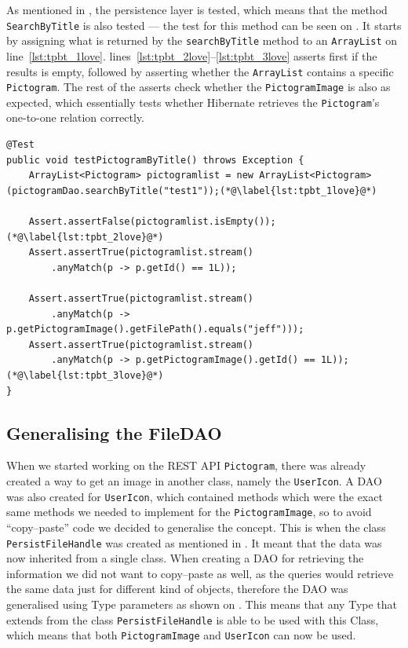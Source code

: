 As mentioned in , the persistence layer is tested, which means that the method \texttt{SearchByTitle} is also tested --- the test for this method can be seen on .
It starts by assigning what is returned by the \texttt{searchByTitle} method to an \texttt{ArrayList} on line~\ref{lst:tpbt_1love}.
lines~\ref{lst:tpbt_2love}--\ref{lst:tpbt_3love} asserts first if the results is empty, followed by asserting whether the \texttt{ArrayList} contains a specific \texttt{Pictogram}.
The rest of the asserts check whether the \texttt{PictogramImage} is also as expected, which essentially tests whether Hibernate retrieves the \texttt{Pictogram}'s one-to-one relation correctly.

\begin{lstlisting}[float, floatplacement=h, caption={The test method which tests the method \texttt{SearchByTitle}.},label={lst:pictogramByTitleTest}]
@Test
public void testPictogramByTitle() throws Exception {
    ArrayList<Pictogram> pictogramlist = new ArrayList<Pictogram>(pictogramDao.searchByTitle("test1"));(*@\label{lst:tpbt_1love}@*)

    Assert.assertFalse(pictogramlist.isEmpty());(*@\label{lst:tpbt_2love}@*)
    Assert.assertTrue(pictogramlist.stream()
        .anyMatch(p -> p.getId() == 1L));

    Assert.assertTrue(pictogramlist.stream()
        .anyMatch(p -> p.getPictogramImage().getFilePath().equals("jeff")));
    Assert.assertTrue(pictogramlist.stream()
        .anyMatch(p -> p.getPictogramImage().getId() == 1L));(*@\label{lst:tpbt_3love}@*)
}
\end{lstlisting}

\subsection{Generalising the FileDAO}\label{subsec:persistfilehandle}
When we started working on the REST API \texttt{Pictogram}, there was already created a way to get an image in another class, namely the \texttt{UserIcon}.
A DAO was also created for \texttt{UserIcon}, which contained methods which were the exact same methods we needed to implement for the \texttt{PictogramImage}, so to avoid \enquote{copy--paste} code we decided to generalise the concept.
This is when the class \texttt{PersistFileHandle} was created as mentioned in .
It meant that the data was now inherited from a single class.
When creating a DAO for retrieving the information we did not want to copy--paste as well, as the queries would retrieve the same data just for different kind of objects, therefore the DAO was generalised using Type parameters as shown on .
This means that any Type that extends from the class \texttt{PersistFileHandle} is able to be used with this Class, which means that both \texttt{PictogramImage} and \texttt{UserIcon} can now be used.

